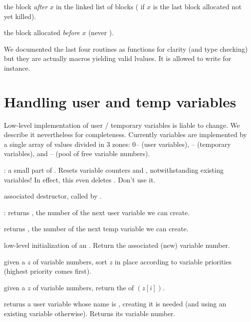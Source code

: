  the block \emph{after} $x$ in the linked list of
blocks ( if $x$ is the last block allocated not yet killed).

 the block allocated \emph{before} $x$ (never
).

We documented the last four routines as functions for clarity (and type
checking) but they are actually macros yielding valid lvalues. It is allowed
to write  for instance.

\section{Handling user and temp variables}
Low-level implementation of user / temporary variables is liable to change. We
describe it nevertheless for completeness. Currently variables are
implemented by a single array of values divided in 3 zones: 0--
(user variables), -- (temporary variables),
and -- (pool of free variable numbers).


: a small part of . Resets
variable counters  and , notwithstanding existing
variables! In effect, this even deletes . Don't use it.

 associated destructor, called by
.

: returns , the number of the next user
variable we can create.

 returns , the number of the
next temp variable we can create.

 low-level initialization of an
. Return the associated (new) variable number.

 given a  $z$ of variable
numbers, sort $z$ in place according to variable priorities (highest priority
comes first).

 given a  $z$ of variable numbers,
return the  of $(z[i])$.


 returns a user variable whose name
is , creating it is needed (and using an existing variable otherwise).
Returns its variable number.

